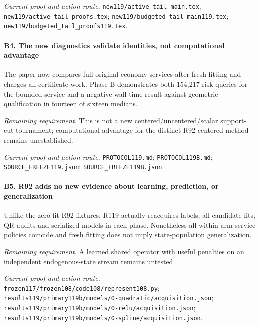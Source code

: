 \par\emph{Current proof and action route.} \nolinkurl{new119/active_tail_main.tex}; \nolinkurl{new119/active_tail_proofs.tex}; \nolinkurl{new119/budgeted_tail_main119.tex}; \nolinkurl{new119/budgeted_tail_proofs119.tex}.

\paragraph{B4. The new diagnostics validate identities, not computational advantage}

The paper now compares full original-economy services after fresh fitting and charges all certificate work. Phase B demonstrates both 154,217 risk queries for the bounded service and a negative wall-time result against geometric qualification in fourteen of sixteen medians.

\par\emph{Remaining requirement.} This is not a new centered/\allowbreak{}uncentered/\allowbreak{}scalar support-cut tournament; computational advantage for the distinct R92 centered method remains unestablished.

\par\emph{Current proof and action route.} \nolinkurl{PROTOCOL119.md}; \nolinkurl{PROTOCOL119B.md}; \nolinkurl{SOURCE_FREEZE119.json}; \nolinkurl{SOURCE_FREEZE119B.json}.

\paragraph{B5. R92 adds no new evidence about learning, prediction, or generalization}

Unlike the zero-fit R92 fixtures, R119 actually reacquires labels, all candidate fits, QR audits and serialized models in each phase. Nonetheless all within-arm service policies coincide and fresh fitting does not imply state-population generalization.

\par\emph{Remaining requirement.} A learned shared operator with useful penalties on an independent endogenous-state stream remains untested.

\par\emph{Current proof and action route.} \nolinkurl{frozen117/frozen108/code108/represent108.py}; \nolinkurl{results119/primary119b/models/0-quadratic/acquisition.json}; \nolinkurl{results119/primary119b/models/0-relu/acquisition.json}; \nolinkurl{results119/primary119b/models/0-spline/acquisition.json}.

